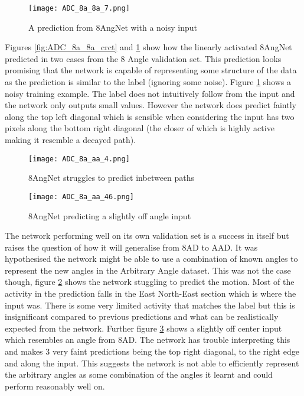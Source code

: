 \begin{figure}
    \centering
    \texttt{[image: ADC\_8a\_8a\_7.png]}
    \caption{A prediction from 8AngNet with a noisy input}
    \label{fig:ADC_8a_8a_noisy}
\end{figure}

Figures \ref{fig:ADC_8a_8a_crct} and \ref{fig:ADC_8a_8a_noisy} show how the linearly activated 8AngNet predicted in two cases from the 8 Angle validation set.
This prediction looks promising that the network is capable of representing some structure of the data as the prediction is similar to the label (ignoring some noise).
Figure \ref{fig:ADC_8a_8a_noisy} shows a noisy training example.
The label does not intuitively follow from the input and the network only outputs small values.
However the network does predict faintly along the top left diagonal which is sensible when considering the input has two pixels along the bottom right diagonal (the closer of which is highly active making it resemble a decayed path). 

\begin{figure}
    \centering
    \texttt{[image: ADC\_8a\_aa\_4.png]}
    \caption{8AngNet struggles to predict inbetween paths}
    \label{fig:ADC_8aNoaa}
\end{figure}

\begin{figure}
    \centering
    \texttt{[image: ADC\_8a\_aa\_46.png]}
    \caption{8AngNet predicting a slightly off angle input}
    \label{fig:ADC_8aNoaa_fork}
\end{figure}

The network performing well on its own validation set is a success in itself but raises the question of how it will generalise from 8AD to AAD.
It was hypothesised the network might be able to use a combination of known angles to represent the new angles in the Arbitrary Angle dataset.
This was not the case though, figure \ref{fig:ADC_8aNoaa} shows the network stuggling to predict the motion.
Most of the activity in the prediction falls in the East North-East section which is where the input was.
There is some very limited activity that matches the label but this is insignificant compared to previous predictions and what can be realistically expected from the network. 
Further figure \ref{fig:ADC_8aNoaa_fork} shows a slightly off center input which resembles an angle from 8AD. 
The network has trouble interpreting this and makes 3 very faint predictions being the top right diagonal, to the right edge and along the input.
This suggests the network is not able to efficiently represent the arbitrary angles as some combination of the angles it learnt and could perform reasonably well on.


